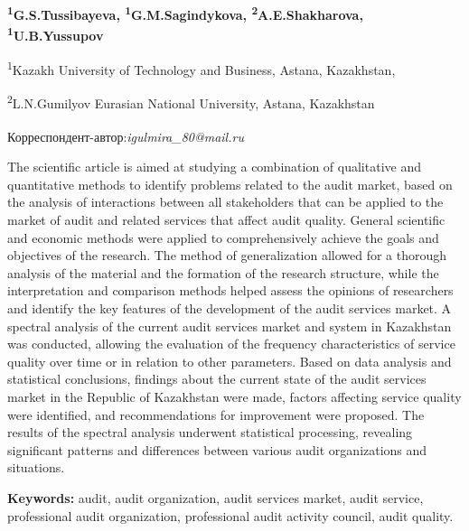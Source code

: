 
\begin{articleheader}

{\bfseries \textsuperscript{1}G.S.Tussibayeva\textsuperscript{\envelope},
\textsuperscript{1}G.M.Sagindykova, \textsuperscript{2}A.E.Shakharova,
\textsuperscript{1}U.B.Yussupov}
\end{articleheader}

\begin{affiliation}

\textsuperscript{1}Kazakh University of Technology and Business, Astana,
Kazakhstan,

\textsuperscript{2}L.N.Gumilyov Eurasian National University, Astana,
Kazakhstan

\raggedright\textbf{\textsuperscript{\envelope}}Корреспондент-автор:\emph{igulmira\_80@mail.ru}
\end{affiliation}

The scientific article is aimed at studying a combination of qualitative
and quantitative methods to identify problems related to the audit
market, based on the analysis of interactions between all stakeholders
that can be applied to the market of audit and related services that
affect audit quality. General scientific and economic methods were
applied to comprehensively achieve the goals and objectives of the
research. The method of generalization allowed for a thorough analysis
of the material and the formation of the research structure, while the
interpretation and comparison methods helped assess the opinions of
researchers and identify the key features of the development of the
audit services market. A spectral analysis of the current audit services
market and system in Kazakhstan was conducted, allowing the evaluation
of the frequency characteristics of service quality over time or in
relation to other parameters. Based on data analysis and statistical
conclusions, findings about the current state of the audit services
market in the Republic of Kazakhstan were made, factors affecting
service quality were identified, and recommendations for improvement
were proposed. The results of the spectral analysis underwent
statistical processing, revealing significant patterns and differences
between various audit organizations and situations.

\textbf{Keywords:} audit, audit organization, audit services market,
audit service, professional audit organization, professional audit
activity council, audit quality.

